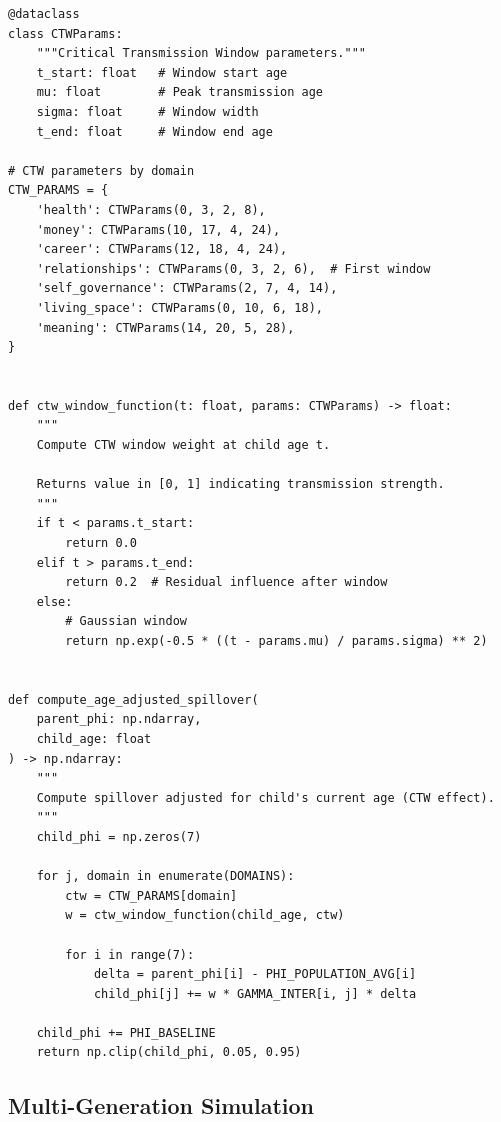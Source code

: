 \begin{verbatim}
@dataclass
class CTWParams:
    """Critical Transmission Window parameters."""
    t_start: float   # Window start age
    mu: float        # Peak transmission age
    sigma: float     # Window width
    t_end: float     # Window end age

# CTW parameters by domain
CTW_PARAMS = {
    'health': CTWParams(0, 3, 2, 8),
    'money': CTWParams(10, 17, 4, 24),
    'career': CTWParams(12, 18, 4, 24),
    'relationships': CTWParams(0, 3, 2, 6),  # First window
    'self_governance': CTWParams(2, 7, 4, 14),
    'living_space': CTWParams(0, 10, 6, 18),
    'meaning': CTWParams(14, 20, 5, 28),
}


def ctw_window_function(t: float, params: CTWParams) -> float:
    """
    Compute CTW window weight at child age t.

    Returns value in [0, 1] indicating transmission strength.
    """
    if t < params.t_start:
        return 0.0
    elif t > params.t_end:
        return 0.2  # Residual influence after window
    else:
        # Gaussian window
        return np.exp(-0.5 * ((t - params.mu) / params.sigma) ** 2)


def compute_age_adjusted_spillover(
    parent_phi: np.ndarray,
    child_age: float
) -> np.ndarray:
    """
    Compute spillover adjusted for child's current age (CTW effect).
    """
    child_phi = np.zeros(7)

    for j, domain in enumerate(DOMAINS):
        ctw = CTW_PARAMS[domain]
        w = ctw_window_function(child_age, ctw)

        for i in range(7):
            delta = parent_phi[i] - PHI_POPULATION_AVG[i]
            child_phi[j] += w * GAMMA_INTER[i, j] * delta

    child_phi += PHI_BASELINE
    return np.clip(child_phi, 0.05, 0.95)
\end{verbatim}

\subsection{Multi-Generation Simulation}

